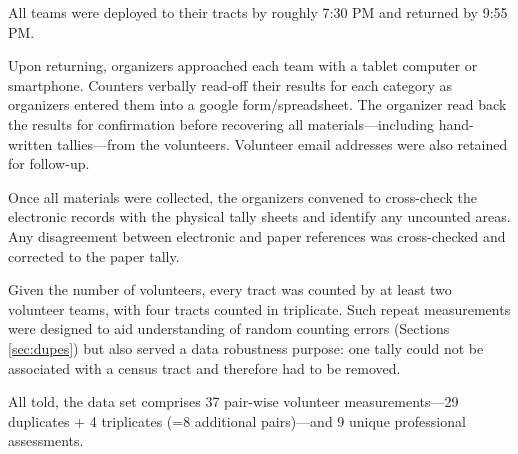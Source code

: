 \documentclass[11pt,twocolumn]{article}
\begin{document}
All teams were deployed to their tracts by roughly 7:30 PM and returned by 9:55 PM.

Upon returning, organizers approached each team with a tablet computer or smartphone. Counters 
verbally read-off their results for each category as organizers entered them into a google 
form/spreadsheet. The organizer read back the results for confirmation before recovering all 
materials---including hand-written tallies---from the volunteers. Volunteer email addresses 
were also retained for follow-up. 

Once all materials were collected, the organizers convened to cross-check the electronic records
with the physical tally sheets and identify any uncounted areas. Any disagreement between electronic
and paper references was cross-checked and corrected to the paper tally.

Given the number of volunteers, every tract was counted by at least two volunteer teams, with four
tracts counted in triplicate. Such repeat measurements were designed to aid understanding of random 
counting errors (Sections \ref{sec:dupes}) but also served a data robustness purpose: one tally
could not be associated with a census tract and therefore had to be removed. 

All told, the data set comprises 37 pair-wise volunteer measurements---29 duplicates + 
4 triplicates (=8 additional pairs)---and 9 unique professional assessments.
\end{document}
